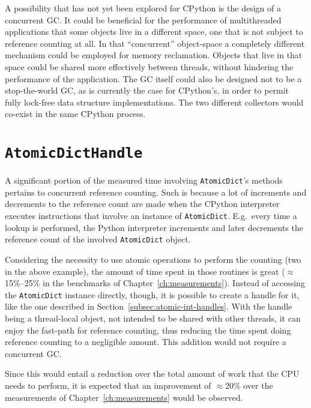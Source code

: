 A possibility that has not yet been explored for CPython is the design of a concurrent GC\@.
It could be beneficial for the performance of multithreaded applications that some objects live in a different space, one that is not subject to reference counting at all.
In that ``concurrent'' object-space a completely different mechanism could be employed for memory reclamation.
Objects that live in that space could be shared more effectively between threads, without hindering the performance of the application.
The GC itself could also be designed not to be a stop-the-world GC, as is currently the case for CPython's, in order to permit fully lock-free data structure implementations.
The two different collectors would co-exist in the same CPython process.


\section{\texttt{AtomicDictHandle}}\label{sec:atomicdicthandle}

A significant portion of the measured time involving \texttt{AtomicDict}'s methods pertains to concurrent reference counting.
Such is because a lot of increments and decrements to the reference count are made when the CPython interpreter executes instructions that involve an instance of \texttt{AtomicDict}.
E.g.\ every time a lookup is performed, the Python interpreter increments and later decrements the reference count of the involved \texttt{AtomicDict} object.

Considering the necessity to use atomic operations to perform the counting (two in the above example), the amount of time spent in those routines is great ($\approx$15\%--25\% in the benchmarks of Chapter~\ref{ch:measurements}).
Instead of accessing the \texttt{AtomicDict} instance directly, though, it is possible to create a handle for it, like the one described in Section~\ref{subsec:atomic-int-handles}.
With the handle being a thread-local object, not intended to be shared with other threads, it can enjoy the fast-path for reference counting, thus reducing the time spent doing reference counting to a negligible amount.
This addition would not require a concurrent GC\@.

Since this would entail a reduction over the total amount of work that the CPU needs to perform, it is expected that an improvement of $\approx$20\% over the measurements of Chapter~\ref{ch:measurements} would be observed.



